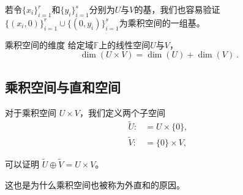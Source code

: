 若令$\{x_i\}^r_{i=1}$和$\{y_i\}^s_{i=1}$分别为$U$与$V$的基，我们也容易验证$\{(x_i, 0)\}^r_{i=1}\cup \{(0, y_i)\}^s_{i=1}$为乘积空间的一组基。

\begin{theorem}{乘积空间的维度}
给定域$\mathbb F $上的线性空间$U$与$V$，
$$
\dim(U \times V) = \dim(U) + \dim(V)~.
$$
\end{theorem}

\subsection{乘积空间与直和空间}

对于乘积空间 $U \times V$，我们定义两个子空间
$$
\begin{aligned}
\tilde{U}: &= U \times \{0\} , \\
\tilde{V}: &= \{0\} \times V ,
\end{aligned}~
$$

可以证明 $\tilde{U} \oplus \tilde{V} = U \times V$。

这也是为什么乘积空间也被称为外直和的原因。

